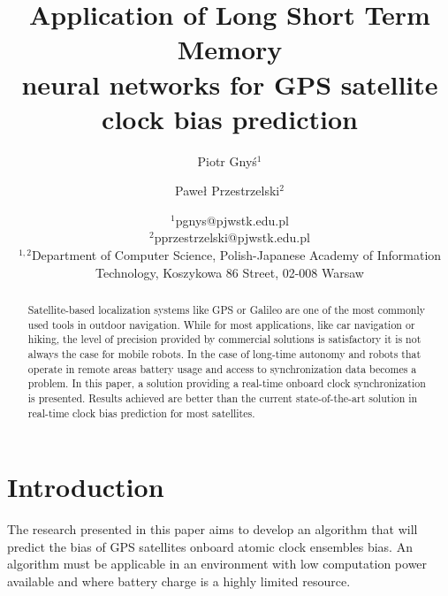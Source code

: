 \documentclass{article}
\begin{document}
\pagestyle{myheadings}
\title{Application of Long Short Term Memory \\  neural  networks for GPS satellite \\ clock 
bias prediction}

\author{ }
\author{Piotr Gny\'{s}$^1$ \and Pawe\l{} Przestrzelski$^2$}
\date{%
    $^1$pgnys@pjwstk.edu.pl \\%
    $^2$pprzestrzelski@pjwstk.edu.pl \\%
	$^{1,2}$Department of Computer Science,  Polish-Japanese Academy of 
	Information Technology, Koszykowa 86 Street, 02-008 Warsaw \\%
}


\maketitle

\begin{abstract}
Satellite-based localization systems like GPS or Galileo are one of the most commonly used tools
in outdoor navigation. While for most applications, like car navigation or hiking, the level of
precision provided by commercial solutions is satisfactory it is not always the case for mobile
robots. In the case of long-time autonomy and robots that operate in remote areas battery usage
and access to synchronization data becomes a problem. In this paper, a solution providing a 
real-time onboard clock synchronization is presented. Results achieved are better than the current
state-of-the-art solution in real-time clock bias prediction for most satellites.
\end{abstract}



\section{Introduction}
The research presented in this paper aims to develop an algorithm that will predict the bias of
GPS satellites onboard atomic clock ensembles bias. An algorithm must be applicable in an environment with low computation power available and where battery charge is a highly limited
resource.
\end{document}
